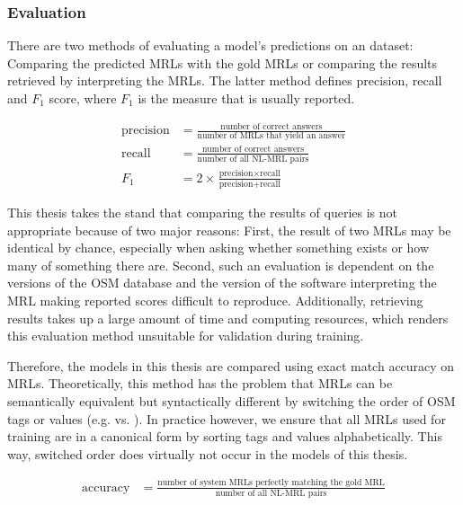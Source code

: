 \subsubsection{\nlmaps{} Evaluation}

There are two methods of evaluating a model’s predictions on an \nlmaps{}
dataset: Comparing the predicted MRLs with the gold MRLs or comparing the
results retrieved by interpreting the MRLs. The latter method defines precision,
recall and \(F_1\) score, where \(F_1\) is the measure that is usually reported.

\begin{align*}
  \text{precision} &= \frac{\text{number of correct answers}}{\text{number of MRLs that yield an answer}}\\
  \text{recall} &= \frac{\text{number of correct answers}}{\text{number of all NL-MRL pairs}}\\
  F_1 &= 2 \times \frac{\text{precision} \times \text{recall}}{\text{precision} + \text{recall}}
\end{align*}

This thesis takes the stand that comparing the results of queries is not
appropriate because of two major reasons: First, the result of two MRLs may be
identical by chance, especially when asking whether something exists or how many
of something there are. Second, such an evaluation is dependent on the versions
of the OSM database and the version of the software interpreting the MRL making
reported scores difficult to reproduce. Additionally, retrieving results takes
up a large amount of time and computing resources, which renders this evaluation
method unsuitable for validation during training.

Therefore, the models in this thesis are compared using exact match accuracy on
MRLs. Theoretically, this method has the problem that MRLs can be semantically
equivalent but syntactically different by switching the order of OSM tags or
values (e.g.   vs.
  ). In practice
however, we ensure that all MRLs used for training are in a canonical form by
sorting tags and values alphabetically. This way, switched order does virtually
not occur in the models of this thesis.

\begin{align*}
  \text{accuracy} &= \frac{\text{number of system MRLs perfectly matching the gold MRL}}{\text{number of all NL-MRL pairs}}
\end{align*}


